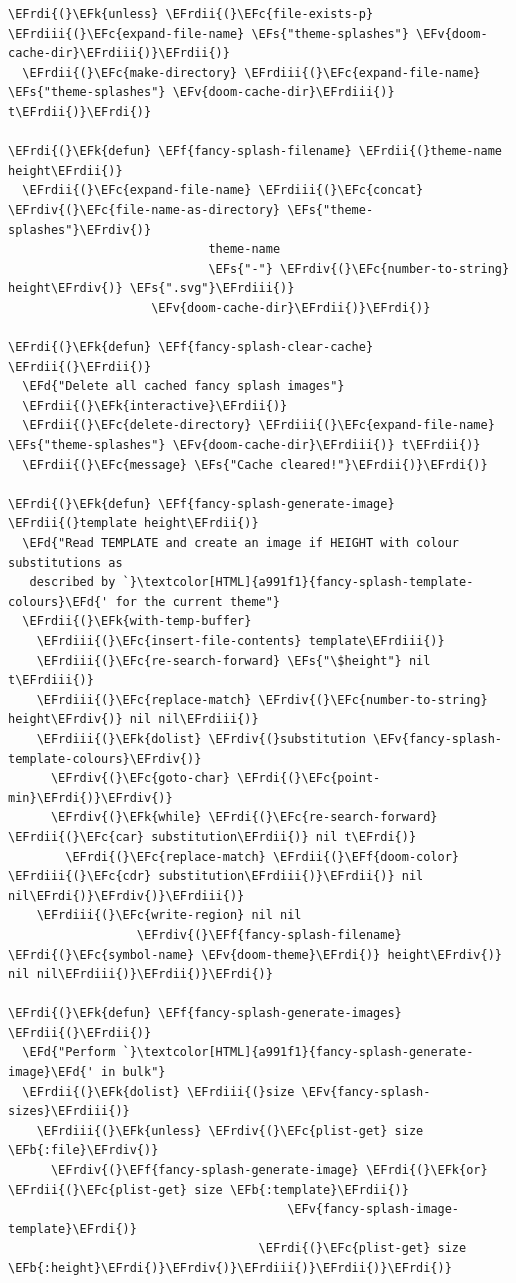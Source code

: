 \documentclass{scrartcl}
\newcommand{\EFk}[1]{\textcolor{EFk}{#1}} %
\newcommand{\EFd}[1]{\textcolor{EFd}{#1}} %
\newcommand{\EFs}[1]{\textcolor{EFs}{#1}} %
\newcommand{\EFb}[1]{\textcolor{EFb}{#1}} %
\newcommand{\EFc}[1]{\textcolor{EFc}{#1}} %
\newcommand{\EFv}[1]{\textcolor{EFv}{#1}} %
\newcommand{\EFf}[1]{\textcolor{EFf}{#1}} %
\newcommand{\EFrdi}[1]{#1} %
\newcommand{\EFrdii}[1]{#1} %
\newcommand{\EFrdiii}[1]{#1} %
\newcommand{\EFrdiv}[1]{#1} %
\begin{document}
\begin{Code}
\begin{Verbatim}[]
\EFrdi{(}\EFk{unless} \EFrdii{(}\EFc{file-exists-p} \EFrdiii{(}\EFc{expand-file-name} \EFs{"theme-splashes"} \EFv{doom-cache-dir}\EFrdiii{)}\EFrdii{)}
  \EFrdii{(}\EFc{make-directory} \EFrdiii{(}\EFc{expand-file-name} \EFs{"theme-splashes"} \EFv{doom-cache-dir}\EFrdiii{)} t\EFrdii{)}\EFrdi{)}

\EFrdi{(}\EFk{defun} \EFf{fancy-splash-filename} \EFrdii{(}theme-name height\EFrdii{)}
  \EFrdii{(}\EFc{expand-file-name} \EFrdiii{(}\EFc{concat} \EFrdiv{(}\EFc{file-name-as-directory} \EFs{"theme-splashes"}\EFrdiv{)}
                            theme-name
                            \EFs{"-"} \EFrdiv{(}\EFc{number-to-string} height\EFrdiv{)} \EFs{".svg"}\EFrdiii{)}
                    \EFv{doom-cache-dir}\EFrdii{)}\EFrdi{)}

\EFrdi{(}\EFk{defun} \EFf{fancy-splash-clear-cache} \EFrdii{(}\EFrdii{)}
  \EFd{"Delete all cached fancy splash images"}
  \EFrdii{(}\EFk{interactive}\EFrdii{)}
  \EFrdii{(}\EFc{delete-directory} \EFrdiii{(}\EFc{expand-file-name} \EFs{"theme-splashes"} \EFv{doom-cache-dir}\EFrdiii{)} t\EFrdii{)}
  \EFrdii{(}\EFc{message} \EFs{"Cache cleared!"}\EFrdii{)}\EFrdi{)}

\EFrdi{(}\EFk{defun} \EFf{fancy-splash-generate-image} \EFrdii{(}template height\EFrdii{)}
  \EFd{"Read TEMPLATE and create an image if HEIGHT with colour substitutions as
   described by `}\textcolor[HTML]{a991f1}{fancy-splash-template-colours}\EFd{' for the current theme"}
  \EFrdii{(}\EFk{with-temp-buffer}
    \EFrdiii{(}\EFc{insert-file-contents} template\EFrdiii{)}
    \EFrdiii{(}\EFc{re-search-forward} \EFs{"\$height"} nil t\EFrdiii{)}
    \EFrdiii{(}\EFc{replace-match} \EFrdiv{(}\EFc{number-to-string} height\EFrdiv{)} nil nil\EFrdiii{)}
    \EFrdiii{(}\EFk{dolist} \EFrdiv{(}substitution \EFv{fancy-splash-template-colours}\EFrdiv{)}
      \EFrdiv{(}\EFc{goto-char} \EFrdi{(}\EFc{point-min}\EFrdi{)}\EFrdiv{)}
      \EFrdiv{(}\EFk{while} \EFrdi{(}\EFc{re-search-forward} \EFrdii{(}\EFc{car} substitution\EFrdii{)} nil t\EFrdi{)}
        \EFrdi{(}\EFc{replace-match} \EFrdii{(}\EFf{doom-color} \EFrdiii{(}\EFc{cdr} substitution\EFrdiii{)}\EFrdii{)} nil nil\EFrdi{)}\EFrdiv{)}\EFrdiii{)}
    \EFrdiii{(}\EFc{write-region} nil nil
                  \EFrdiv{(}\EFf{fancy-splash-filename} \EFrdi{(}\EFc{symbol-name} \EFv{doom-theme}\EFrdi{)} height\EFrdiv{)} nil nil\EFrdiii{)}\EFrdii{)}\EFrdi{)}

\EFrdi{(}\EFk{defun} \EFf{fancy-splash-generate-images} \EFrdii{(}\EFrdii{)}
  \EFd{"Perform `}\textcolor[HTML]{a991f1}{fancy-splash-generate-image}\EFd{' in bulk"}
  \EFrdii{(}\EFk{dolist} \EFrdiii{(}size \EFv{fancy-splash-sizes}\EFrdiii{)}
    \EFrdiii{(}\EFk{unless} \EFrdiv{(}\EFc{plist-get} size \EFb{:file}\EFrdiv{)}
      \EFrdiv{(}\EFf{fancy-splash-generate-image} \EFrdi{(}\EFk{or} \EFrdii{(}\EFc{plist-get} size \EFb{:template}\EFrdii{)}
                                       \EFv{fancy-splash-image-template}\EFrdi{)}
                                   \EFrdi{(}\EFc{plist-get} size \EFb{:height}\EFrdi{)}\EFrdiv{)}\EFrdiii{)}\EFrdii{)}\EFrdi{)}


\end{Verbatim}
\end{Code}
\end{document}
